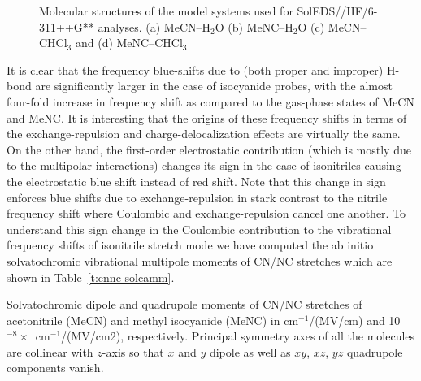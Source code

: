 \documentclass[a4paper,titlepage,twoside,fleqn,12pt]{book}
\begin{document}
\begin{refsection}
%
\begin{figure}[b!]
\centering
\setlength\fboxsep{0.4pt}
\setlength\fboxrule{0.5pt}
\caption{
Molecular structures of the model systems used for SolEDS//HF/6-311++G**
analyses. (a) MeCN--H$_2$O (b) MeNC--H$_2$O (c) MeCN--CHCl$_3$ and (d) MeNC--CHCl$_3$
\label{f:cnnc-soleds-str}}
\end{figure}
%
It is clear that the 
frequency blue\hyp{}shifts due to (both proper and improper) H-bond are significantly larger in the 
case of isocyanide probes, with the almost four\hyp{}fold increase in frequency shift as compared
to the gas\hyp{}phase states of MeCN and MeNC. It is interesting that the origins of these 
frequency shifts in terms of the exchange\hyp{}repulsion and charge\hyp{}delocalization effects are 
virtually the same. On the other hand, the first\hyp{}order electrostatic contribution (which is 
mostly due to the multipolar interactions) changes its sign in the case of isonitriles causing 
the electrostatic blue shift instead of red shift. Note that this change in sign enforces blue 
shifts due to exchange\hyp{}repulsion in stark contrast to the nitrile frequency shift where 
Coulombic and exchange\hyp{}repulsion cancel one another. To understand this sign change in the 
Coulombic contribution to the vibrational frequency shifts of isonitrile stretch mode we have 
computed the ab initio solvatochromic vibrational multipole moments%
of CN/NC stretches which are shown in Table~\ref{t:cnnc-solcamm}.
%
\begin{table}[t!]
\caption{Solvatochromic dipole and quadrupole moments of CN/NC stretches of
acetonitrile (MeCN) and methyl isocyanide (MeNC) in cm$^{-1}$/(MV/cm) and 10$^{-8}\times$\
cm$^{-1}$/(MV/cm2), respectively. Principal symmetry axes of all the molecules are collinear with 
$z$-axis so that $x$ and $y$ dipole as well as $xy$, $xz$, $yz$ quadrupole components vanish. 
}
\end{table}
\end{refsection}
\end{document}
